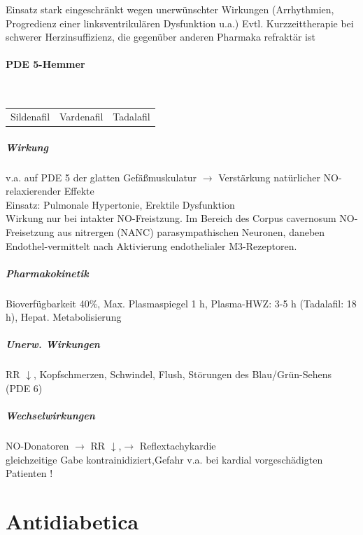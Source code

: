 \documentclass[10pt,a4paper]{report}
\begin{document}
Einsatz stark eingeschränkt wegen unerwünschter Wirkungen (Arrhythmien, Progredienz einer linksventrikulären Dysfunktion u.a.)
Evtl. Kurzzeittherapie bei schwerer Herzinsuffizienz, die gegenüber anderen Pharmaka refraktär ist

\subsubsection{PDE 5-Hemmer} \mbox{} \\
\begin{tabularx}{\textwidth}{XXX}
Sildenafil&Vardenafil&Tadalafil\\
\end{tabularx}

\paragraph{Wirkung}
v.a. auf PDE 5 der glatten Gefäßmuskulatur
$\rightarrow$ Verstärkung natürlicher NO-relaxierender Effekte \\  
Einsatz: Pulmonale Hypertonie,	Erektile Dysfunktion\\
Wirkung nur bei intakter NO-Freistzung.  Im Bereich des Corpus cavernosum NO-Freisetzung aus nitrergen (NANC) parasympathischen Neuronen, daneben Endothel-vermittelt nach Aktivierung endothelialer M3-Rezeptoren.

\paragraph{Pharmakokinetik} Bioverfügbarkeit 40\%, Max. Plasmaspiegel 1 h, Plasma-HWZ: 3-5 h (Tadalafil: 18 h), Hepat. Metabolisierung

\paragraph{Unerw. Wirkungen} RR $\downarrow$, Kopfschmerzen, Schwindel, Flush, Störungen des Blau/Grün-Sehens (PDE 6)

\paragraph{Wechselwirkungen}
NO-Donatoren $\rightarrow$ RR $\downarrow$,$\rightarrow$ Reflextachykardie\\
gleichzeitige Gabe kontrainidiziert,Gefahr v.a. bei kardial vorgeschädigten Patienten !
\chapter{Antidiabetica} %
\label{cha:antidiabetica}
\end{document}
